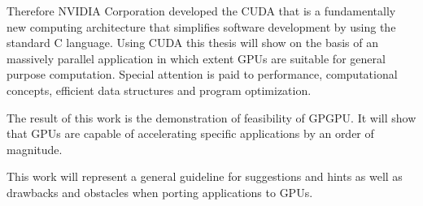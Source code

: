 Therefore NVIDIA Corporation developed the \gls{CUDA} that is a fundamentally new
computing architecture that simplifies software development by using the
standard C language. Using \gls{CUDA} this thesis will show on the basis of an
massively parallel application in which extent \glspl{GPU} are suitable for
general purpose computation. Special attention is paid to performance,
computational concepts, efficient data structures and program optimization.

The result of this work is the demonstration of feasibility of \gls{GPGPU}. It
will show that \glspl{GPU} are capable of accelerating specific applications by
an order of magnitude.

This work will represent a general guideline for suggestions and hints as 
well as drawbacks and obstacles when porting applications to \glspl{GPU}.


\vfill